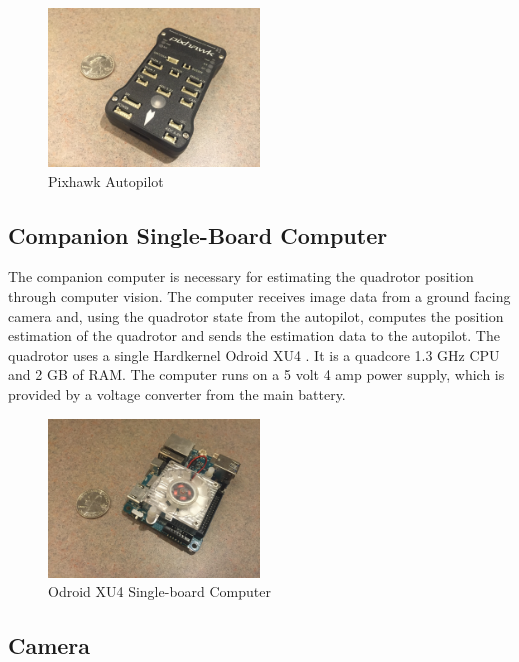 \begin{figure}
    \centering
    \includegraphics[width=0.5\textwidth]{graphics/pixhawk.jpg}
    \caption{Pixhawk Autopilot}
    \label{fig:pixhawk}
\end{figure}

\subsection{Companion Single-Board Computer}

The companion computer is necessary for estimating the quadrotor position through computer vision. The computer receives image data from a ground facing camera and, using the quadrotor state from the autopilot, computes the position estimation of the quadrotor and sends the estimation data to the autopilot. The quadrotor uses a single Hardkernel Odroid XU4 \cite{hardkernel}. It is a quadcore 1.3 GHz CPU and 2 GB of RAM. The computer runs on a 5 volt 4 amp power supply, which is provided by a voltage converter from the main battery.

\begin{figure}
    \centering
    \includegraphics[width=0.5\textwidth]{graphics/odroid.jpg}
    \caption{Odroid XU4 Single-board Computer}
    \label{fig:odroid}
\end{figure}

\subsection{Camera}

